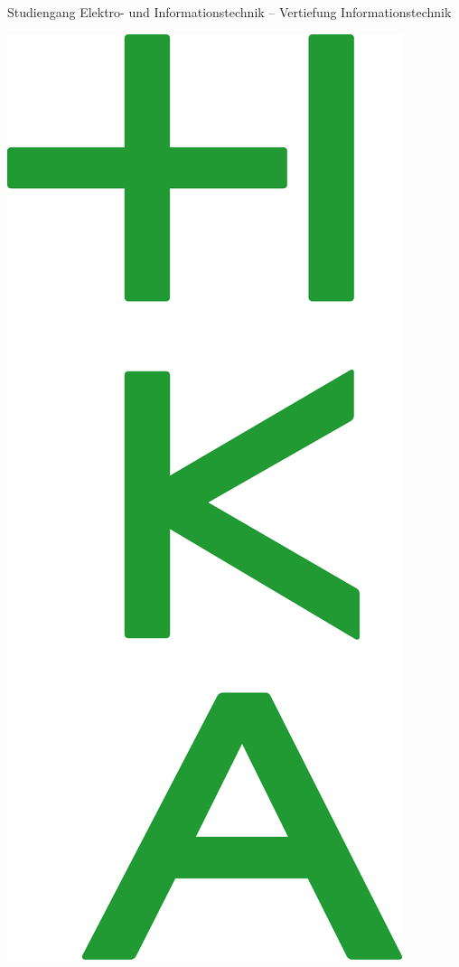 \begin{titlepage}
\begin{minipage}[t]{13cm}
        \Large
        Studiengang Elektro- und Informationstechnik – 
        Vertiefung Informationstechnik
    \end{minipage}
    \hspace{1.5cm}
    \begin{minipage}{3cm}\raggedright
        \includegraphics[width=\textwidth]{Template_HKA/hka_bachelor.png}
    \end{minipage}
    

\end{titlepage}
